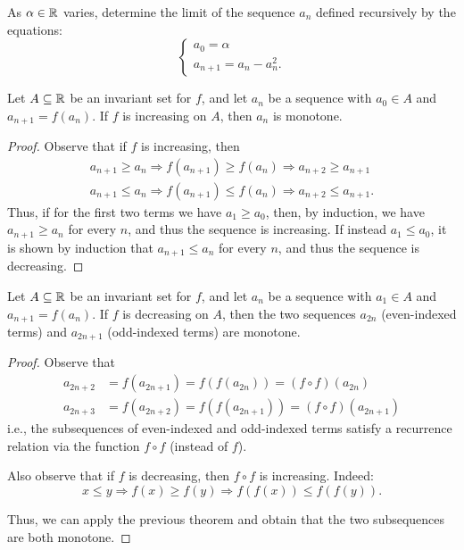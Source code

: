 \begin{exercise}
As $\alpha \in {\mathbb R}$ varies,
determine the limit of the sequence $a_n$ defined recursively by the
equations:
\[
\begin{cases}
 a_0 = \alpha \\
 a_{n+1} = a_n - a_n^2.
\end{cases}
\]
\end{exercise}

\begin{theorem}
\mymark{**}%
  Let $A\subseteq {\mathbb R}$ be an invariant set for $f$, and let $a_n$ be a sequence
  with $a_0\in A$ and $a_{n+1} = f(a_n)$. If $f$ is increasing
  on $A$, then $a_n$
  is monotone.
\end{theorem}
\begin{proof}
\mymark{**}%
  Observe that if $f$ is increasing, then
  \begin{align*}
    a_{n+1} \ge a_n \Rightarrow f(a_{n+1}) \ge f(a_n) \Rightarrow
    a_{n+2} \ge a_{n+1}\\
        a_{n+1} \le a_n \Rightarrow f(a_{n+1}) \le f(a_n) \Rightarrow a_{n+2}
    \le a_{n+1}.
  \end{align*}
  Thus, if for the first two terms we have $a_1 \ge a_0$, then, by
  induction, we have $a_{n+1} \ge a_n$ for every $n$, and thus the
  sequence is increasing. If instead $a_1 \le a_0$, it is shown by
  induction that $a_{n+1} \le a_n$ for every $n$, and thus the sequence
  is decreasing.
\end{proof}

\begin{theorem}\label{th_decr}%
\mymark{**}%
  Let $A\subseteq {\mathbb R}$ be an invariant set for $f$, and let $a_n$ be a sequence
  with $a_1\in A$ and $a_{n+1} = f(a_n)$. If $f$ is decreasing
  on $A$,
  then the two sequences $a_{2n}$ (even-indexed terms) and
  $a_{2n+1}$ (odd-indexed terms) are monotone.
\end{theorem}
\begin{proof}
\mymark{**}%
  Observe that
  \begin{align*}
    a_{2n+2} &= f(a_{2n+1}) = f(f(a_{2n})) = (f\circ f)(a_{2n})\\
    a_{2n+3} &= f(a_{2n+2}) = f(f(a_{2n+1})) = (f\circ f)(a_{2n+1})
  \end{align*}
i.e., the subsequences of even-indexed and odd-indexed terms satisfy a
recurrence relation via the function
$f\circ f$ (instead of $f$).

Also observe that if $f$ is decreasing, then $f\circ f$ is
increasing. Indeed:
\[
x \le y \Rightarrow f(x) \ge f(y) \Rightarrow f(f(x)) \le f(f(y)).
\]

Thus, we can apply the previous theorem and obtain that the two
subsequences are both monotone.
\end{proof}


